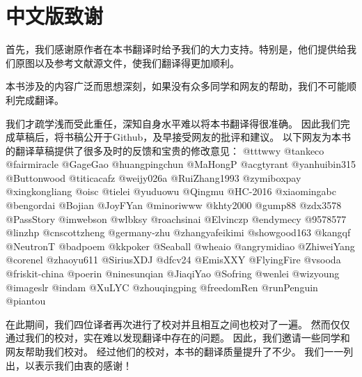 \chapter*{中文版致谢}

首先，我们感谢原作者在本书翻译时给予我们的大力支持。特别是，他们提供给我们原图以及参考文献源文件，使我们翻译得更加顺利。

本书涉及的内容广泛而思想深刻，如果没有众多同学和网友的帮助，我们不可能顺利完成翻译。

我们才疏学浅而受此重任，深知自身水平难以将本书翻译得很准确。
因此我们完成草稿后，将书稿公开于Github，及早接受网友的批评和建议。
以下网友为本书的翻译草稿提供了很多及时的反馈和宝贵的修改意见：
@tttwwy @tankeco @fairmiracle @GageGao @huangpingchun @MaHongP @acgtyrant @yanhuibin315 @Buttonwood @titicacafz @weijy026a @RuiZhang1993 @zymiboxpay @xingkongliang 
@oisc @tielei @yuduowu @Qingmu @HC-2016 @xiaomingabc @bengordai @Bojian @JoyFYan @minoriwww @khty2000 @gump88 @zdx3578 @PassStory @imwebson @wlbksy @roachsinai 
@Elvinczp @endymecy @9578577 @linzhp @cnscottzheng @germany-zhu @zhangyafeikimi @showgood163 @kangqf @NeutronT @badpoem @kkpoker @Seaball @wheaio @angrymidiao
@ZhiweiYang @corenel @zhaoyu611 @SiriusXDJ @dfcv24 @EmisXXY @FlyingFire @vsooda @friskit-china @poerin @ninesunqian @JiaqiYao @Sofring @wenlei @wizyoung 
@imageslr @indam @XuLYC @zhouqingping @freedomRen @runPenguin @piantou

在此期间，我们四位译者再次进行了校对并且相互之间也校对了一遍。
然而仅仅通过我们的校对，实在难以发现翻译中存在的问题。
因此，我们邀请一些同学和网友帮助我们校对。
经过他们的校对，本书的翻译质量提升了不少。
我们一一列出，以表示我们由衷的感谢！


